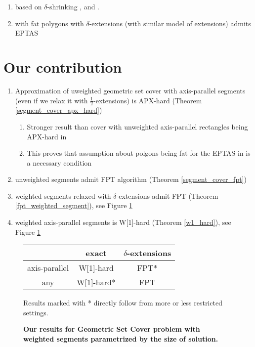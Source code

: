 \begin{enumerate}
\item based on $\delta$-shrinking \cite{shrinking_original}, \cite{shriking1} and \cite{shrinking2}.
\item with fat polygons with $\delta$-extensions (with similar model of extensions) admits EPTAS \cite{harpeled12}
\end{enumerate}

\section{Our contribution}
\begin{enumerate}
\item Approximation of uweighted geometric set cover with axis-parallel segments
(even if we relax it with  $\frac{1}{2}$-extensions) is APX-hard
(Theorem \ref{segment_cover_apx_hard})
	\begin{enumerate}
	\item Stronger result than cover with unweighted axis-parallel
	rectangles being APX-hard in \cite{settling_apx_hardness}
	\item This proves that assumption about polgons being fat for
	the EPTAS in \cite{harpeled12} is a necessary condition
	\end{enumerate}
\item unweighted segments admit FPT algorithm (Theorem \ref{segment_cover_fpt})
\item weighted segments relaxed with $\delta$-extensions admit FPT (Theorem \ref{fpt_weighted_segment}),
    see Figure \ref{tab:weighted_fpt}
\item weighted axis-parallel segments is W[1]-hard (Theorem \ref{w1_hard}),
    see Figure \ref{tab:weighted_fpt}

\end{enumerate}


\begin{figure}[h]
\begin{center}
\begin{tabular}{ | c | c | c | }
\hline
                & exact     & $\delta$-extensions \\ 
\hline                
 axis-parallel   & W[1]-hard & FPT* \\  
\hline                
 any             & W[1]-hard* & FPT \\
\hline                
\end{tabular}
\caption{\textbf{Our results for Geometric Set Cover problem with weighted segments 
parametrized by the size of solution.}}

Results marked with * directly follow from more or less restricted settings.
\label{tab:weighted_fpt}
\end{center}
\end{figure}


